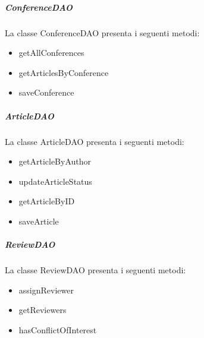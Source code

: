 \subparagraph{ConferenceDAO}
La classe ConferenceDAO presenta i seguenti metodi:
\begin{itemize}
\item getAllConferences
\item getArticlesByConference
\item saveConference
\end{itemize}

\subparagraph{ArticleDAO}
La classe ArticleDAO presenta i seguenti metodi:
\begin{itemize}
\item getArticleByAuthor
\item updateArticleStatus
\item getArticleByID
\item saveArticle
\end{itemize}

\subparagraph{ReviewDAO}
La classe ReviewDAO presenta i seguenti metodi:
\begin{itemize}
\item assignReviewer
\item getReviewers
\item hasConflictOfInterest
\end{itemize}

